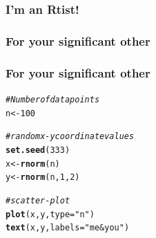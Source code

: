 \documentclass[12pt]{beamer}\usepackage[]{graphicx}\usepackage[]{color}
\makeatletter
\newcommand{\hlnum}[1]{\textcolor[rgb]{0.686,0.059,0.569}{#1}}%
\newcommand{\hlstr}[1]{\textcolor[rgb]{0.192,0.494,0.8}{#1}}%
\newcommand{\hlcom}[1]{\textcolor[rgb]{0.678,0.584,0.686}{\textit{#1}}}%
\newcommand{\hlstd}[1]{\textcolor[rgb]{0.345,0.345,0.345}{#1}}%
\newcommand{\hlkwb}[1]{\textcolor[rgb]{0.69,0.353,0.396}{#1}}%
\newcommand{\hlkwc}[1]{\textcolor[rgb]{0.333,0.667,0.333}{#1}}%
\newcommand{\hlkwd}[1]{\textcolor[rgb]{0.737,0.353,0.396}{\textbf{#1}}}%
\newenvironment{kframe}{%
 \def\at@end@of@kframe{}%
 \ifinner\ifhmode%
  \def\at@end@of@kframe{\end{minipage}}%
  \begin{minipage}{\columnwidth}%
 \fi\fi%
 \def\FrameCommand##1{\hskip\@totalleftmargin \hskip-\fboxsep
 \colorbox{shadecolor}{##1}\hskip-\fboxsep
     \hskip-\linewidth \hskip-\@totalleftmargin \hskip\columnwidth}%
 \MakeFramed {\advance\hsize-\width
   \@totalleftmargin\z@ \linewidth\hsize
   \@setminipage}}%
 {\par\unskip\endMakeFramed%
 \at@end@of@kframe}
\newenvironment{knitrout}{}{} %
\makeatother
\begin{document}

\begin{frame}[fragile]
\frametitle{I'm an Rtist!}
\begin{center}
\end{center}
\end{frame}


\begin{frame}
\begin{center}
\Huge{}
\end{center}
\end{frame}


\begin{frame}
\frametitle{For your significant other}
\begin{center}
\end{center}
\end{frame}


\begin{frame}[fragile]
\frametitle{For your significant other}

\begin{knitrout}\footnotesize
{}\color{fgcolor}\begin{kframe}
\begin{alltt}
\hlcom{# Number of data points}
\hlstd{n} \hlkwb{<-} \hlnum{100}

\hlcom{# random x-y coordinate values}
\hlkwd{set.seed}\hlstd{(}\hlnum{333}\hlstd{)}
\hlstd{x} \hlkwb{<-} \hlkwd{rnorm}\hlstd{(n)}
\hlstd{y} \hlkwb{<-} \hlkwd{rnorm}\hlstd{(n,} \hlnum{1}\hlstd{,} \hlnum{2}\hlstd{)}

\hlcom{# scatter-plot}
\hlkwd{plot}\hlstd{(x, y,} \hlkwc{type} \hlstd{=} \hlstr{"n"}\hlstd{)}
\hlkwd{text}\hlstd{(x, y,} \hlkwc{labels} \hlstd{=} \hlstr{"me & you"}\hlstd{)}
\end{alltt}
\end{kframe}
\end{knitrout}

\end{frame}

\end{document}
